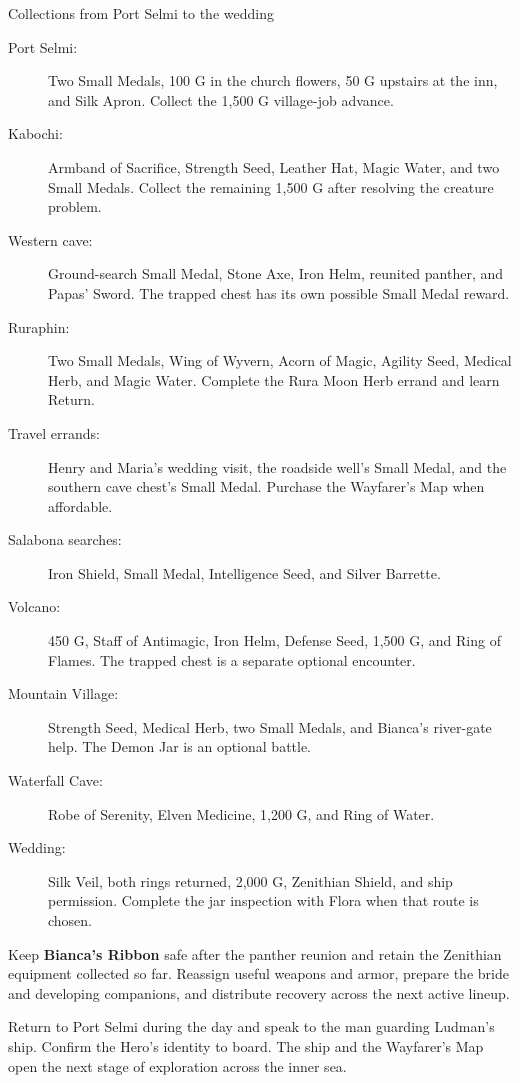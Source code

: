 \begin{routecheck}{Collections from Port Selmi to the wedding}
\begin{description}
  \item[Port Selmi:] Two Small Medals, 100 G in the church flowers,
    50 G upstairs at the inn, and Silk Apron. Collect the 1,500 G
    village-job advance.
  \item[Kabochi:] Armband of Sacrifice, Strength Seed, Leather Hat,
    Magic Water, and two Small Medals. Collect the remaining 1,500 G
    after resolving the creature problem.
  \item[Western cave:] Ground-search Small Medal, Stone Axe, Iron Helm,
    reunited panther, and Papas' Sword. The trapped chest has its own
    possible Small Medal reward.
  \item[Ruraphin:] Two Small Medals, Wing of Wyvern, Acorn of Magic,
    Agility Seed, Medical Herb, and Magic Water. Complete the Rura Moon
    Herb errand and learn Return.
  \item[Travel errands:] Henry and Maria's wedding visit, the roadside
    well's Small Medal, and the southern cave chest's Small Medal.
    Purchase the Wayfarer's Map when affordable.
  \item[Salabona searches:] Iron Shield, Small Medal, Intelligence Seed,
    and Silver Barrette.
  \item[Volcano:] 450 G, Staff of Antimagic, Iron Helm, Defense Seed,
    1,500 G, and Ring of Flames. The trapped chest is a separate
    optional encounter.
  \item[Mountain Village:] Strength Seed, Medical Herb, two Small
    Medals, and Bianca's river-gate help. The Demon Jar is an optional
    battle.
  \item[Waterfall Cave:] Robe of Serenity, Elven Medicine, 1,200 G,
    and Ring of Water.
  \item[Wedding:] Silk Veil, both rings returned, 2,000 G, Zenithian
    Shield, and ship permission. Complete the jar inspection with Flora
    when that route is chosen.
\end{description}
\end{routecheck}

Keep \textbf{Bianca's Ribbon} safe after the panther reunion and
retain the Zenithian equipment collected so far. Reassign useful
weapons and armor, prepare the bride and developing companions, and
distribute recovery across the next active lineup.

Return to Port Selmi during the day and speak to the man guarding
Ludman's ship. Confirm the Hero's identity to board. The ship and the
Wayfarer's Map open the next stage of exploration across the inner sea.

